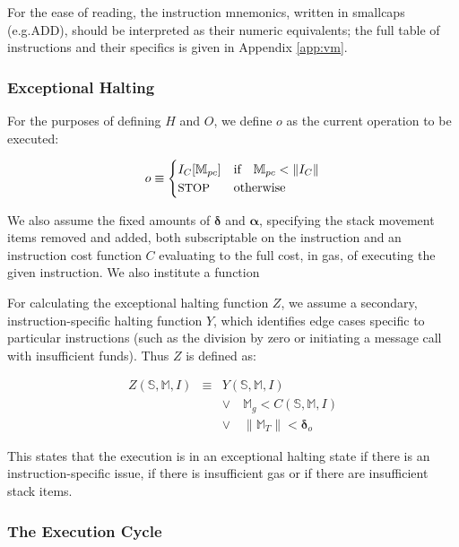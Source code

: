 \documentclass[9pt,oneside]{amsart}
\makeatletter
\newcommand*\eg{e.g.\@\xspace}
\makeatother
\begin{document}
\begin{multicols}{2}
For the ease of reading, the instruction mnemonics, written in smallcaps (\eg {\small ADD}), should be interpreted as their numeric equivalents; the full table of instructions and their specifics is given in Appendix \ref{app:vm}.

\subsubsection{Exceptional Halting}

For the purposes of defining $H$ and $O$, we define $o$ as the current operation to be executed:

\begin{equation}
o \equiv \begin{cases} I_C[\mathbb{M}_{pc}] & \text{if} \quad \mathbb{M}_{pc} < \lVert I_C \rVert \\
\text{\small STOP} & \text{otherwise}
\end{cases}
\end{equation}

We also assume the fixed amounts of $\mathbf{\delta}$ and $\mathbf{\alpha}$, specifying the stack movement items removed and added, both subscriptable on the instruction and an instruction cost function $C$ evaluating to the full cost, in gas, of executing the given instruction. We also institute a function

For calculating the exceptional halting function $Z$, we assume a secondary, instruction-specific halting function $Y$, which identifies edge cases specific to particular instructions (such as the division by zero or initiating a message call with insufficient funds). Thus $Z$ is defined as:

\begin{equation}
\begin{array} {lll}
Z(\mathbb{S}, \mathbb{M}, I) & \equiv & Y(\mathbb{S}, \mathbb{M}, I) \\
& & \vee \quad \mathbb{M}_g < C(\mathbb{S}, \mathbb{M}, I) \\
& & \vee \quad \lVert\mathbb{M}_T\rVert < \mathbf{\delta}_o
\end{array}
\end{equation}

This states that the execution is in an exceptional halting state if there is an instruction-specific issue, if there is insufficient gas or if there are insufficient stack items.

\subsubsection{The Execution Cycle}


\end{multicols}
\end{document}
